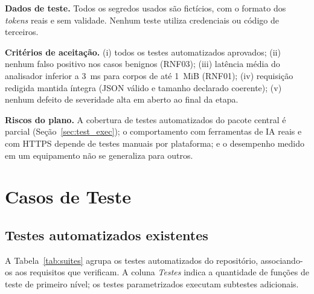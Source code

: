 \textbf{Dados de teste.} Todos os segredos usados são fictícios, com o formato dos \textit{tokens} reais e sem validade. Nenhum teste utiliza credenciais ou código de terceiros.

\textbf{Critérios de aceitação.} (i) todos os testes automatizados aprovados; (ii) nenhum falso positivo nos casos benignos (RNF03); (iii) latência média do analisador inferior a 3~ms para corpos de até 1~MiB (RNF01); (iv) requisição redigida mantida íntegra (JSON válido e tamanho declarado coerente); (v) nenhum defeito de severidade alta em aberto ao final da etapa.

\textbf{Riscos do plano.} A cobertura de testes automatizados do pacote central é parcial (Seção~\ref{sec:test_exec}); o comportamento com ferramentas de IA reais e com HTTPS depende de testes manuais por plataforma; e o desempenho medido em um equipamento não se generaliza para outros.

\section{Casos de Teste}
\label{sec:test_casos}

\subsection{Testes automatizados existentes}

A Tabela~\ref{tab:suites} agrupa os testes automatizados do repositório, associando-os aos requisitos que verificam. A coluna \textit{Testes} indica a quantidade de funções de teste de primeiro nível; os testes parametrizados executam subtestes adicionais.

